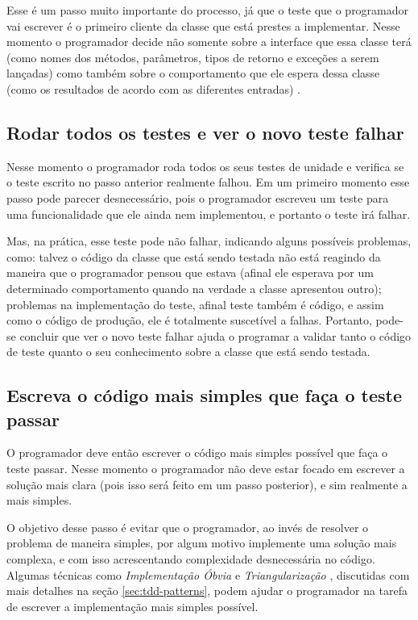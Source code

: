 Esse é um passo muito importante do processo, já que o teste que o programador vai escrever é o primeiro cliente da classe que está
prestes a implementar. Nesse momento o programador decide não somente sobre a interface que essa classe terá (como nomes dos métodos,
parâmetros, tipos de retorno e exceções a serem lançadas) como também sobre o comportamento que ele espera dessa classe (como 
os resultados de acordo com as diferentes entradas) \cite{GOOS}.

\subsection{Rodar todos os testes e ver o novo teste falhar}

Nesse momento o programador roda todos os seus testes de unidade e verifica se o teste escrito no passo anterior realmente falhou. Em um
primeiro momento esse passo pode parecer desnecessário, pois o programador escreveu um teste para uma funcionalidade que ele ainda nem
implementou, e portanto o teste irá falhar. 

Mas, na prática, esse teste pode não falhar, indicando alguns possíveis problemas, como: talvez o código da classe que está sendo testada
não está reagindo da maneira que o programador pensou que estava (afinal ele esperava por um determinado comportamento quando na verdade a
classe apresentou outro); problemas na implementação do teste, afinal teste também é código, e assim como o código de produção, ele é
totalmente suscetível a falhas.
Portanto, pode-se concluir que ver o novo teste falhar ajuda o programar a validar tanto o código de teste quanto o seu conhecimento
sobre a classe que está sendo testada. 

\subsection{Escreva o código mais simples que faça o teste passar}

O programador deve então escrever o código mais simples possível que faça o teste passar. Nesse momento o programador não deve estar
focado em escrever a solução mais clara (pois isso será feito em um passo posterior), e sim realmente a mais simples.

O objetivo desse passo é evitar que o programador, ao invés de resolver o problema de maneira simples, por algum motivo
implemente uma solução mais complexa, e com isso acrescentando complexidade desnecessária no código. Algumas técnicas como
\textit{Implementação Óbvia} e \textit{Triangularização} \cite{TDDByExample}, discutidas com mais detalhes na seção \ref{sec:tdd-patterns}, 
podem ajudar o programador na tarefa de escrever a implementação mais simples possível.

